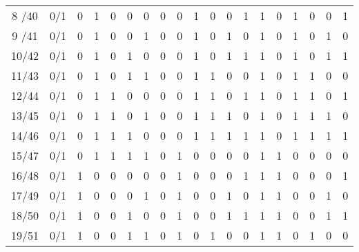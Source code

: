 \begin{table}[H]
\begin{adjustbox}{max width=\textwidth}
\begin{tabular}{ c | c | c | c | c | c | c ||| c | c | c | c | c | c || c | c | c | c | c | c }
      8 /40 & 0/1 & 0 & 1 & 0 & 0 & 0 &   0 & 0 & 1 & 0 & 0 & 1 &   1 & 0 & 1 & 0 & 0 & 1 \\
      9 /41 & 0/1 & 0 & 1 & 0 & 0 & 1 &   0 & 0 & 1 & 0 & 1 & 0 &   1 & 0 & 1 & 0 & 1 & 0 \\
      10/42 & 0/1 & 0 & 1 & 0 & 1 & 0 &   0 & 0 & 1 & 0 & 1 & 1 &   1 & 0 & 1 & 0 & 1 & 1 \\
      11/43 & 0/1 & 0 & 1 & 0 & 1 & 1 &   0 & 0 & 1 & 1 & 0 & 0 &   1 & 0 & 1 & 1 & 0 & 0 \\ \hline
      12/44 & 0/1 & 0 & 1 & 1 & 0 & 0 &   0 & 0 & 1 & 1 & 0 & 1 &   1 & 0 & 1 & 1 & 0 & 1 \\
      13/45 & 0/1 & 0 & 1 & 1 & 0 & 1 &   0 & 0 & 1 & 1 & 1 & 0 &   1 & 0 & 1 & 1 & 1 & 0 \\
      14/46 & 0/1 & 0 & 1 & 1 & 1 & 0 &   0 & 0 & 1 & 1 & 1 & 1 &   1 & 0 & 1 & 1 & 1 & 1 \\
      15/47 & 0/1 & 0 & 1 & 1 & 1 & 1 &   0 & 1 & 0 & 0 & 0 & 0 &   1 & 1 & 0 & 0 & 0 & 0 \\ \hline
      16/48 & 0/1 & 1 & 0 & 0 & 0 & 0 &   0 & 1 & 0 & 0 & 0 & 1 &   1 & 1 & 0 & 0 & 0 & 1 \\
      17/49 & 0/1 & 1 & 0 & 0 & 0 & 1 &   0 & 1 & 0 & 0 & 1 & 0 &   1 & 1 & 0 & 0 & 1 & 0 \\
      18/50 & 0/1 & 1 & 0 & 0 & 1 & 0 &   0 & 1 & 0 & 0 & 1 & 1 &   1 & 1 & 0 & 0 & 1 & 1 \\
      19/51 & 0/1 & 1 & 0 & 0 & 1 & 1 &   0 & 1 & 0 & 1 & 0 & 0 &   1 & 1 & 0 & 1 & 0 & 0 \\ \hline

\end{tabular}
\end{adjustbox}
\end{table}
